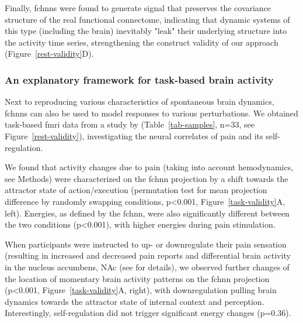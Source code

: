 \documentclass{article}
\begin{document}
Finally, \acrshort{fchnn}s were found to generate signal that preserves the covariance structure of the real functional connectome, indicating that dynamic systems of this type (including the brain) inevitably "leak" their underlying structure into the activity time series, strengthening the construct validity of our approach (Figure~\ref{rest-validity}D).

\subsubsection{An explanatory framework for task-based brain activity}

Next to reproducing various characteristics of spontaneous brain dynamics, \acrshort{fchnn}s can also be used to model responses to various perturbations. We obtained task-based \acrshort{fmri} data from a study by \citet{woo2015distinct} (Table~\ref{tab-samples}, n=33, see Figure~\ref{rest-validity}), investigating the neural correlates of pain and its self-regulation.

We found that activity changes due to pain (taking into account hemodynamics, see Methods) were characterized on the \acrshort{fchnn} projection by a shift towards the attractor state of action/execution (permutation test for mean projection difference by randomly swapping conditions, p\textless 0.001, Figure~\ref{task-validity}A, left). Energies, as defined by the \acrshort{fchnn}, were also significantly different between the two conditions (p\textless 0.001), with higher energies during pain stimulation.

When participants were instructed to up- or downregulate their pain sensation (resulting in increased and decreased pain reports and differential brain activity in the nucleus accumbens, NAc (see \cite{woo2015distinct} for details), we observed further changes of the location of momentary brain activity patterns on the \acrshort{fchnn} projection (p\textless 0.001, Figure~\ref{task-validity}A, right), with downregulation pulling brain dynamics towards the attractor state of internal context and perception. Interestingly, self-regulation did not trigger significant energy changes (p=0.36).
\end{document}
